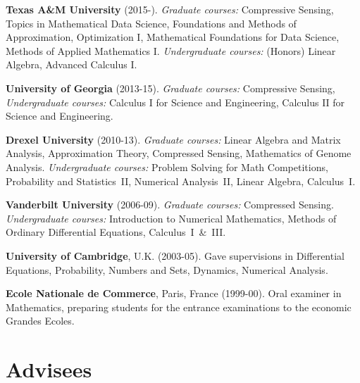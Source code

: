 \documentclass[11pt]{article}
\begin{document}
\bitemize
\item {\bf Texas A\&M University} (2015-).
{\sl Graduate courses:} 
Compressive Sensing,
Topics in Mathematical Data Science,
Foundations and Methods of Approximation,
Optimization I,
Mathematical Foundations for Data Science,
Methods of Applied Mathematics I.
{\sl Undergraduate courses:} (Honors) Linear Algebra, Advanced Calculus I.
\item {\bf University of Georgia} (2013-15).
{\sl Graduate courses:}
Compressive Sensing,
{\sl Undergraduate courses:}
Calculus I for Science and Engineering,
Calculus II for Science and Engineering.
\item {\bf Drexel University} (2010-13).
{\sl Graduate courses:}
Linear Algebra and Matrix Analysis, 
Approximation Theory,
Compressed Sensing,
Mathematics of Genome Analysis.
{\sl Undergraduate courses: }
Problem Solving for Math Competitions,
Probability and Statistics~II,
Numerical Analysis~II,
Linear Algebra,
Calculus~I. 
\item {\bf Vanderbilt University} (2006-09). 
{\sl Graduate courses:}
Compressed Sensing. 
{\sl Undergraduate courses:}
Introduction to Numerical Mathematics,
Methods of Ordinary Differential Equations,
 Calculus~I~\&~III.
\item {\bf University of Cambridge}, U.K. (2003-05). Gave supervisions in Differential
 Equations, Probability, Numbers and Sets, Dynamics, Numerical
 Analysis.
 \item {\bf Ecole Nationale de Commerce}, Paris, France (1999-00). Oral
 examiner in Mathematics, preparing students for the
 entrance examinations to the economic Grandes Ecoles.
 \eitemize
 
  
\section{Advisees}
\end{document}
